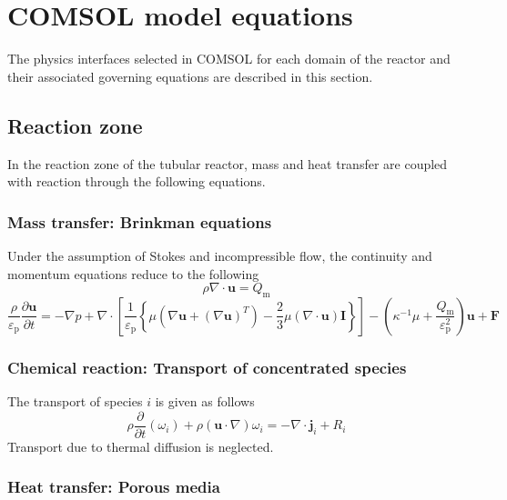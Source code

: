 \section{COMSOL model equations}
\label{app:comsol}

The physics interfaces selected in COMSOL for each domain of the reactor and their associated governing equations are described in this section.

\subsection{Reaction zone}

In the reaction zone of the tubular reactor, mass and heat transfer are coupled with reaction through the following equations.

\subsubsection{Mass transfer: Brinkman equations}

Under the assumption of Stokes and incompressible flow, the continuity and momentum equations reduce to the following \cite{comsol_cfd_2020}
\begin{equation}
    \rho\nabla \cdot \mathbf{u}=Q_{\mathrm{m}}
\end{equation}
\begin{equation}
    \frac{\rho}{\varepsilon_{\mathrm{p}}} \frac{\partial \mathbf{u}}{\partial t} =
    -\nabla p+\nabla \cdot\left[\frac{1}{\varepsilon_{\mathrm{p}}}\left\{\mu\left(\nabla \mathbf{u}+(\nabla \mathbf{u})^{T}\right)-\frac{2}{3} \mu(\nabla \cdot \mathbf{u}) \mathbf{I}\right\}\right]-\left(\kappa^{-1} \mu+\frac{Q_{\mathrm{m}}}{\varepsilon_{\mathrm{p}}^{2}}\right) \mathbf{u}+\mathbf{F}
\end{equation}

\subsubsection{Chemical reaction: Transport of concentrated species}
The transport of species $i$ is given as follows \cite{comsol_cfd_2020}
\begin{equation}
    \rho \frac{\partial}{\partial t}\left(\omega_{i}\right)+\rho(\mathbf{u} \cdot \nabla) \omega_{i}=-\nabla \cdot \mathbf{j}_{i}+R_{i}
\end{equation}
Transport due to thermal diffusion is neglected.

\subsubsection{Heat transfer: Porous media}

